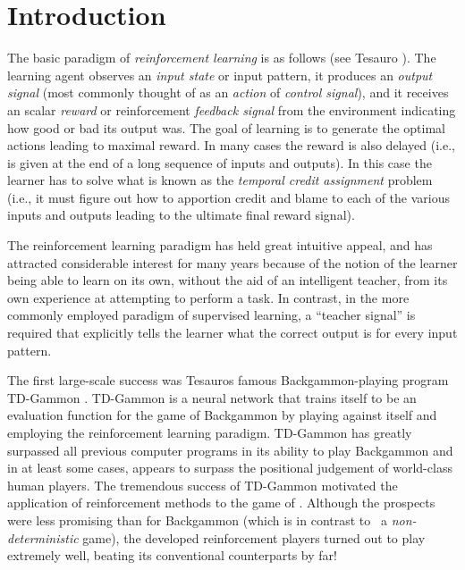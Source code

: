 \chapter{Introduction}

The basic paradigm of \emph{reinforcement learning} is as follows (see Tesauro \cite{lig*Tesauro95}). The learning agent observes an \emph{input state} or input pattern, it produces an \emph{output signal} (most commonly thought of as an \emph{action} of \emph{control signal}), and it receives an scalar \emph{reward} or reinforcement \emph{feedback signal} from the environment indicating how good or bad its output was. The goal of learning is to generate the optimal actions leading to maximal reward. In many cases the reward is also delayed (i.e., is given at the end of a long sequence of inputs and outputs). In this case the learner has to solve what is known as the \emph{temporal credit assignment}  problem (i.e., it must figure out how to apportion credit and blame to each of the various inputs and outputs leading to the ultimate final reward signal).

The reinforcement learning paradigm has held great intuitive appeal, and has attracted considerable interest for many years because of the notion of the learner being able to learn on its own, without the aid of an intelligent teacher, from its own experience at attempting to perform a task. In contrast, in the more commonly employed paradigm of supervised learning,  a ``teacher signal'' is required that explicitly tells the learner what the correct output is for every input pattern.

The first large-scale success was Tesauros  famous Backgammon-playing program TD-Gam\-mon \cite{lig*Tesauro94}. TD-Gammon  is a neural network that trains itself to be an evaluation function for the game of Backgammon by playing against itself and employing the reinforcement learning paradigm. TD-Gammon has greatly surpassed all previous computer programs in its ability to play Backgammon and in at least some cases, appears to surpass the positional judgement of world-class human players. The tremendous success of TD-Gammon motivated the application of reinforcement methods to the game of \Abalone. Although the prospects were less promising than for Backgammon (which is in contrast to \Abalone\ a \emph{non-deterministic} game), the developed reinforcement players turned out to play extremely well, beating its conventional counterparts by far!


